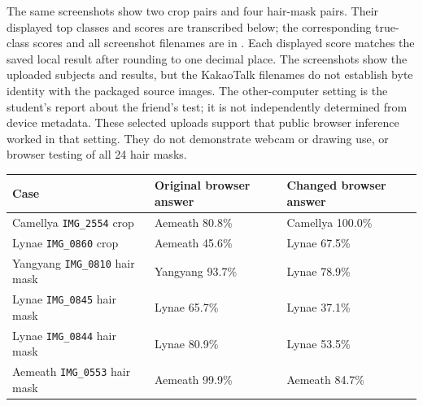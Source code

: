 \documentclass[11pt]{article}
\begin{document}
The same screenshots show two crop pairs and four hair-mask pairs. Their displayed top classes and scores are transcribed below; the corresponding true-class scores and all screenshot filenames are in . Each displayed score matches the saved local result after rounding to one decimal place. The screenshots show the uploaded subjects and results, but the KakaoTalk filenames do not establish byte identity with the packaged source images. The other-computer setting is the student's report about the friend's test; it is not independently determined from device metadata. These selected uploads support that public browser inference worked in that setting. They do not demonstrate webcam or drawing use, or browser testing of all 24 hair masks.
\begin{center}\small
\setlength{\tabcolsep}{4pt}
\begin{tabular}{lll}
\toprule
Case & Original browser answer & Changed browser answer \\
\midrule
Camellya \texttt{IMG\_2554} crop & Aemeath 80.8\% & Camellya 100.0\% \\
Lynae \texttt{IMG\_0860} crop & Aemeath 45.6\% & Lynae 67.5\% \\
Yangyang \texttt{IMG\_0810} hair mask & Yangyang 93.7\% & Lynae 78.9\% \\
Lynae \texttt{IMG\_0845} hair mask & Lynae 65.7\% & Lynae 37.1\% \\
Lynae \texttt{IMG\_0844} hair mask & Lynae 80.9\% & Lynae 53.5\% \\
Aemeath \texttt{IMG\_0553} hair mask & Aemeath 99.9\% & Aemeath 84.7\% \\
\bottomrule
\end{tabular}
\end{center}
\par\noindent {}\par
\par\noindent\begin{minipage}{\linewidth}
\end{minipage}\par\medskip
\end{document}
